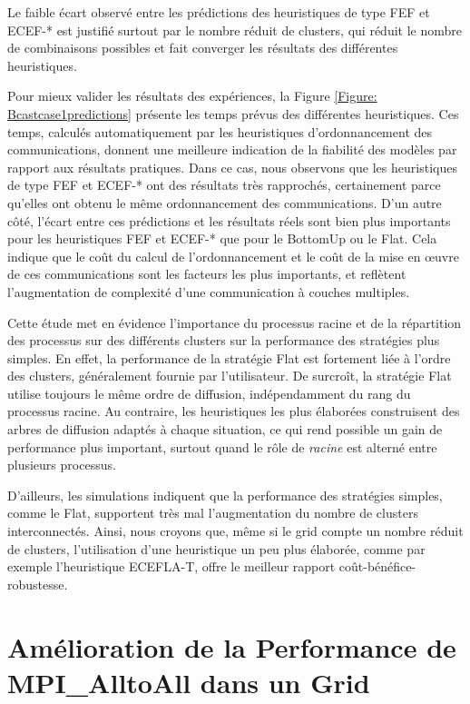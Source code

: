 Le faible écart observé entre les prédictions des heuristiques de
type FEF et ECEF-{*} est justifié surtout par le nombre réduit de
clusters, qui réduit le nombre de combinaisons possibles et fait converger
les résultats des différentes heuristiques. 

Pour mieux valider les résultats des expériences, la Figure \ref{Figure: Bcastcase1predictions}
présente les temps prévus des différentes heuristiques. Ces temps,
calculés automatiquement par les heuristiques d'ordonnancement des
communications, donnent une meilleure indication de la fiabilité des
modèles par rapport aux résultats pratiques. Dans ce cas, nous observons
que les heuristiques de type FEF et ECEF-{*} ont des résultats très
rapprochés, certainement parce qu'elles ont obtenu le même ordonnancement
des communications. D'un autre côté, l'écart entre ces prédictions
et les résultats réels sont bien plus importants pour les heuristiques
FEF et ECEF-{*} que pour le BottomUp ou le Flat. Cela indique que
le coût du calcul de l'ordonnancement et le coût de la mise en {\oe}uvre
de ces communications sont les facteurs les plus importants, et reflètent
l'augmentation de complexité d'une communication à couches multiples.

Cette étude met en évidence l'importance
du processus racine et de la répartition des processus sur des différents
clusters sur la performance des stratégies plus simples. En effet,
la performance de la stratégie Flat est fortement liée à l'ordre des clusters, généralement fournie par l'utilisateur.
De surcroît, la stratégie Flat utilise toujours le même ordre de diffusion,
indépendamment du rang du processus racine. Au contraire, les heuristiques
les plus élaborées construisent des arbres de diffusion adaptés à
chaque situation, ce qui rend possible un gain de performance plus
important, surtout quand le rôle de \emph{racine} est alterné entre
plusieurs processus.

D'ailleurs, les simulations indiquent que la performance des stratégies
simples, comme le Flat, supportent très mal l'augmentation du nombre
de clusters interconnectés.  Ainsi, nous croyons que, même si
le grid compte un nombre réduit de clusters, l'utilisation d'une
heuristique un peu plus élaborée, comme par exemple l'heuristique
ECEFLA-T, offre le meilleur rapport coût-bénéfice-robustesse.


\section{Amélioration de la Performance de MPI\_AlltoAll dans un Grid}

